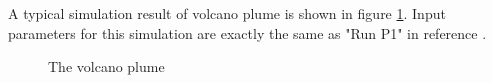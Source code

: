 \documentclass[conference,compsoc]{IEEEtran}
\begin{document}
A typical simulation result of volcano plume is shown in figure \ref{fig:Plume}. Input parameters for this simulation are exactly the same as "Run P1" in reference \cite{suzuki2005numerical}.
\begin{figure}[!t]
\centering
{}
\label{fig:plume_photo}
\hfil
{}
\label{fig:plume_simulation}
\caption{The volcano plume}
\label{fig:Plume}
\end{figure}
\end{document}
